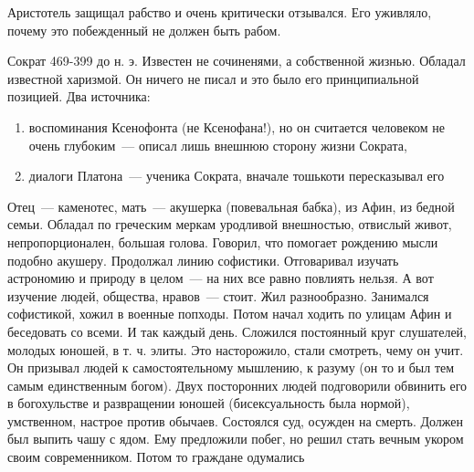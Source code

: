 Аристотель защищал рабство и очень критически отзывался. Его уживляло, почему это побежденный не должен быть рабом. 

Сократ
469-399 до н. э. 
Известен не сочиненями, а собственной жизнью. Обладал известной харизмой. Он ничего не писал и это было его принципиальной позицией. Два источника: 

\begin{enumerate}
	\item воспоминания Ксенофонта (не Ксенофана!), но он считается человеком не очень глубоким~--- описал лишь внешнюю сторону жизни Сократа, 
	\item диалоги Платона~--- ученика Сократа, вначале тошькоти пересказывал его
\end{enumerate}

Отец~--- каменотес, мать~--- акушерка (повевальная бабка), из Афин, из бедной семьи. Обладал по греческим меркам уродливой внешностью, отвислый живот, непропорционален, большая голова. 
Говорил, что помогает рождению мысли подобно акушеру. Продолжал линию софистики. Отговаривал изучать астрономию и природу в целом~--- на них все равно повлиять нельзя. А вот изучение людей, общества, нравов~--- стоит. 
Жил разнообразно. Занимался софистикой, хожил в военные попходы. Потом начал ходить по улицам Афин и беседовать со всеми. И так каждый день. 
Сложился постоянный круг слушателей, молодых юношей, в т. ч. элиты. Это насторожило, стали смотреть, чему он учит. 
Он призывал людей к самостоятельному мышлению, к разуму (он то и был тем самым единственным богом). 
Двух посторонних людей подговорили обвинить его в богохульстве и развращении юношей (бисексуальность была нормой), умственном, настрое против обычаев. 
Состоялся суд, осужден на смерть. Должен был выпить чашу с ядом. Ему предложили побег, но решил стать вечным укором своим современником. Потом то граждане одумались
